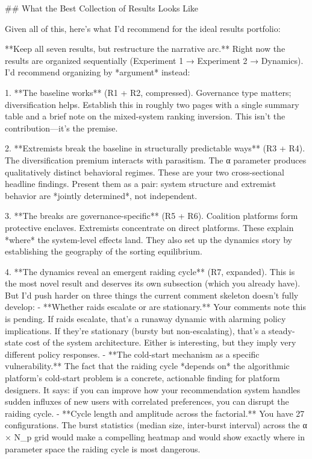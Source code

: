 ## What the Best Collection of Results Looks Like

Given all of this, here's what I'd recommend for the ideal results portfolio:

**Keep all seven results, but restructure the narrative arc.** Right now the results are organized sequentially (Experiment 1 → Experiment 2 → Dynamics). I'd recommend organizing by *argument* instead:

1. **The baseline works** (R1 + R2, compressed). Governance type matters; diversification helps. Establish this in roughly two pages with a single summary table and a brief note on the mixed-system ranking inversion. This isn't the contribution—it's the premise.

2. **Extremists break the baseline in structurally predictable ways** (R3 + R4). The diversification premium interacts with parasitism. The α parameter produces qualitatively distinct behavioral regimes. These are your two cross-sectional headline findings. Present them as a pair: system structure and extremist behavior are *jointly determined*, not independent.

3. **The breaks are governance-specific** (R5 + R6). Coalition platforms form protective enclaves. Extremists concentrate on direct platforms. These explain *where* the system-level effects land. They also set up the dynamics story by establishing the geography of the sorting equilibrium.

4. **The dynamics reveal an emergent raiding cycle** (R7, expanded). This is the most novel result and deserves its own subsection (which you already have). But I'd push harder on three things the current comment skeleton doesn't fully develop:
   - **Whether raids escalate or are stationary.** Your comments note this is pending. If raids escalate, that's a runaway dynamic with alarming policy implications. If they're stationary (bursty but non-escalating), that's a steady-state cost of the system architecture. Either is interesting, but they imply very different policy responses.
   - **The cold-start mechanism as a specific vulnerability.** The fact that the raiding cycle *depends on* the algorithmic platform's cold-start problem is a concrete, actionable finding for platform designers. It says: if you can improve how your recommendation system handles sudden influxes of new users with correlated preferences, you can disrupt the raiding cycle.
   - **Cycle length and amplitude across the factorial.** You have 27 configurations. The burst statistics (median size, inter-burst interval) across the α × N_p grid would make a compelling heatmap and would show exactly where in parameter space the raiding cycle is most dangerous.

